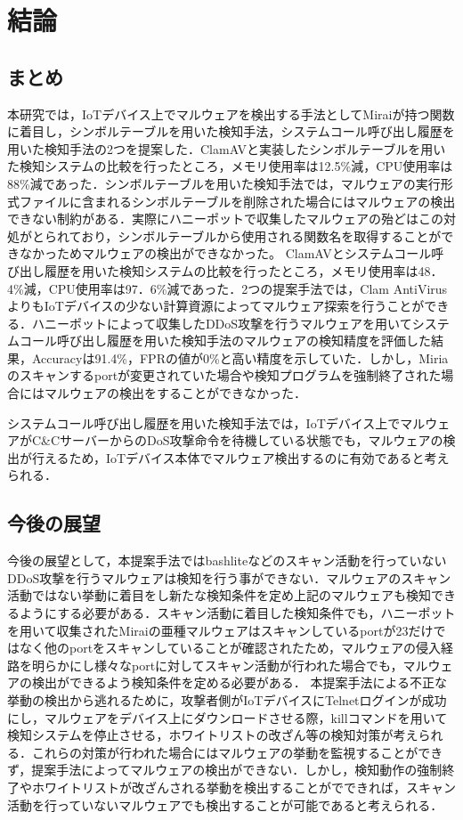 \chapter{結論}

\section{まとめ}
本研究では，IoTデバイス上でマルウェアを検出する手法としてMiraiが持つ関数に着目し，シンボルテーブルを用いた検知手法，システムコール呼び出し履歴を用いた検知手法の2つを提案した．ClamAVと実装したシンボルテーブルを用いた検知システムの比較を行ったところ，メモリ使用率は12.5\%減，CPU使用率は88\%減であった．シンボルテーブルを用いた検知手法では，マルウェアの実行形式ファイルに含まれるシンボルテーブルを削除された場合にはマルウェアの検出できない制約がある．実際にハニーポットで収集したマルウェアの殆どはこの対処がとられており，シンボルテーブルから使用される関数名を取得することができなかっためマルウェアの検出ができなかった。
ClamAVとシステムコール呼び出し履歴を用いた検知システムの比較を行ったところ，メモリ使用率は48．4\%減，CPU使用率は97．6\%減であった．2つの提案手法では，Clam AntiVirusよりもIoTデバイスの少ない計算資源によってマルウェア探索を行うことができる．ハニーポットによって収集したDDoS攻撃を行うマルウェアを用いてシステムコール呼び出し履歴を用いた検知手法のマルウェアの検知精度を評価した結果，Accuracyは91.4\%，FPRの値が0\%と高い精度を示していた．しかし，Miriaのスキャンするportが変更されていた場合や検知プログラムを強制終了された場合にはマルウェアの検出をすることができなかった．\par
システムコール呼び出し履歴を用いた検知手法では，IoTデバイス上でマルウェアがC\&CサーバーからのDoS攻撃命令を待機している状態でも，マルウェアの検出が行えるため，IoTデバイス本体でマルウェア検出するのに有効であると考えられる．

\section{今後の展望}
今後の展望として，本提案手法ではbashliteなどのスキャン活動を行っていないDDoS攻撃を行うマルウェアは検知を行う事ができない．マルウェアのスキャン活動ではない挙動に着目をし新たな検知条件を定め上記のマルウェアも検知できるようにする必要がある．スキャン活動に着目した検知条件でも，ハニーポットを用いて収集されたMiraiの亜種マルウェアはスキャンしているportが23だけではなく他のportをスキャンしていることが確認されたため，マルウェアの侵入経路を明らかにし様々なportに対してスキャン活動が行われた場合でも，マルウェアの検出ができるよう検知条件を定める必要がある．
本提案手法による不正な挙動の検出から逃れるために，攻撃者側がIoTデバイスにTelnetログインが成功にし，マルウェアをデバイス上にダウンロードさせる際，killコマンドを用いて検知システムを停止させる，ホワイトリストの改ざん等の検知対策が考えられる．これらの対策が行われた場合にはマルウェアの挙動を監視することができず，提案手法によってマルウェアの検出ができない．しかし，検知動作の強制終了やホワイトリストが改ざんされる挙動を検出することがでできれば，スキャン活動を行っていないマルウェアでも検出することが可能であると考えられる．
